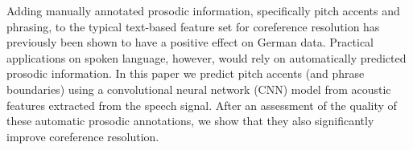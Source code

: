Adding manually annotated prosodic information, specifically pitch accents and phrasing, to the typical text-based feature set for coreference resolution has previously been shown to have a positive effect on German data. Practical applications on spoken language, however, would rely on automatically predicted prosodic information. In this paper we predict pitch accents (and phrase boundaries) using a convolutional neural network (CNN) model from acoustic features extracted from the speech signal. After an assessment of the quality of these automatic prosodic annotations, we show that they also significantly improve coreference resolution.
